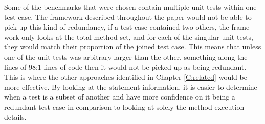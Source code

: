 Some of the benchmarks that were chosen contain multiple unit tests within one test case. The framework described throughout the paper would not be able to pick up this kind of redundancy, if a test case contained two others, the frame work only looks at the total method set, and for each of the singular unit tests, they would match their proportion of the joined test case. This means that unless one of the unit tests was arbitrary larger than the other, something along the lines of 98:1 lines of code then it would not be picked up as being redundant. This is where the other approaches identified in Chapter \ref{C:related} would be more effective. By looking at the statement information, it is easier to determine when a test is a subset of another and have more confidence on it being a redundant test case in comparison to looking at solely the method execution details. 
